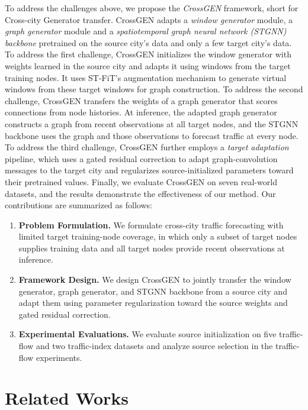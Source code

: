 \documentclass[runningheads,a4paper]{llncs}
\begin{document}
To address the challenges above, we propose the \emph{CrossGEN} framework, short for Cross-city Generator transfer. CrossGEN adapts a \emph{window generator} module, a \emph{graph generator} module and a \emph{spatiotemporal graph neural network (STGNN) backbone} pretrained on the source city's data and only a few target city's data. To address the first challenge, CrossGEN initializes the window generator with weights learned in the source city and adapts it using windows from the target training nodes. It uses ST-FiT's augmentation mechanism to generate virtual windows from these target windows for graph construction. To address the second challenge, CrossGEN transfers the weights of a graph generator that scores connections from node histories. At inference, the adapted graph generator constructs a graph from recent observations at all target nodes, and the STGNN backbone uses the graph and those observations to forecast traffic at every node. To address the third challenge, CrossGEN further employs a \emph{target adaptation} pipeline, which uses a gated residual correction to adapt graph-convolution messages to the target city and regularizes source-initialized parameters toward their pretrained values. Finally, we evaluate CrossGEN on seven real-world datasets, and the results demonstrate the effectiveness of our method. Our contributions are summarized as follows:
\begin{enumerate}
\item \textbf{Problem Formulation.} We formulate cross-city traffic forecasting with limited target training-node coverage, in which only a subset of target nodes supplies training data and all target nodes provide recent observations at inference.
\item \textbf{Framework Design.} We design CrossGEN to jointly transfer the window generator, graph generator, and STGNN backbone from a source city and adapt them using parameter regularization toward the source weights and gated residual correction.
\item \textbf{Experimental Evaluations.} We evaluate source initialization on five traffic-flow and two traffic-index datasets and analyze source selection in the traffic-flow experiments.
\end{enumerate}

\section{Related Works}\label{sec:related}
\end{document}
